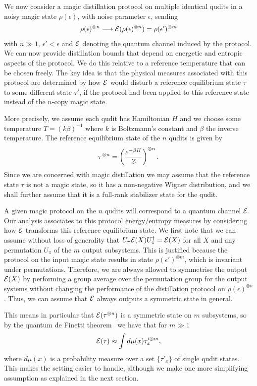 \documentclass[pra,
aps,
twocolumn,
superscriptaddress,
groupedaddress,
nofootinbib,
reprint
]{revtex4-1}
\begin{document}
We now consider a magic distillation protocol on multiple identical qudits in a noisy magic state $\rho(\epsilon)$, with noise parameter $\epsilon$, sending 
\begin{equation}
\rho(\epsilon)^{\otimes n} \longrightarrow {\mathcal E}(\rho(\epsilon)^{\otimes n}) =\rho(\epsilon')^{\otimes m}
\end{equation}
with $n \gg 1$, $\epsilon' <\epsilon$ and ${\mathcal E}$ denoting the quantum channel induced by the protocol. We can now provide distillation bounds that depend on energetic and entropic aspects of the protocol. We do this relative to a reference temperature that can be chosen freely. The key idea is that the physical measures associated with this protocol are determined by how ${\mathcal E}$ would disturb a reference equilibrium state $\tau$ to some different state $\tau'$, if the protocol had been applied to this reference state instead of the $n$-copy magic state. 

More precisely, we assume each qudit has Hamiltonian $H$ and we choose some temperature $T = (k\beta)^{-1}$ where $k$ is Boltzmann's constant and $\beta$ the inverse temperature. The reference equilibrium state of the $n$ qudits is given by
\begin{equation}
\tau^{\otimes n} = \left ( \frac{e^{-\beta H}}{\mathcal{Z}} \right )  ^{\otimes n}.
\end{equation}
Since we are concerned with magic distillation we may assume that the reference state $\tau$ is not a magic state, so it has a non-negative Wigner distribution, and we shall further assume that it is a full-rank stabilizer state for the qudit. 

A given magic protocol on the $n$ qudits will correspond to a quantum channel ${\mathcal E}$. Our analysis associates to this protocol energy/entropy measures by considering how ${\mathcal E}$ transforms this reference equilibrium state. We first note that we can assume without loss of generality that $U_\pi{\mathcal E}(X) U_\pi^\dagger = {\mathcal E}(X)$ for all $X$ and any permutation $U_\pi$ of the $m$ output subsystems. This is justified because the protocol on the input magic state results in state $\rho(\epsilon')^{\otimes m}$, which is invariant under permutations. Therefore, we are always allowed to symmetrise the output ${\mathcal E}(X)$ by performing a group average over the permutation group for the output systems without changing the performance of the distillation protocol on $\rho(\epsilon)^{\otimes n}$. Thus, we can assume that ${\mathcal E}$ always outputs a symmetric state in general.

This means in particular that ${\mathcal E}(\tau^{\otimes n})$ is a symmetric state on $m$ subsystems, so by the quantum de Finetti theorem~\cite{christandl_2007} we have that for $m \gg 1$
\begin{equation}
{\mathcal E}(\tau) \approx \int d\mu(x) \tau_x^{\prime \otimes m},
\end{equation}
where $d\mu(x)$ is a probability measure over a set $\{\tau'_x\}$ of single qudit states. This makes the setting easier to handle, although we make one more simplifying assumption as explained in the next section.
\end{document}
